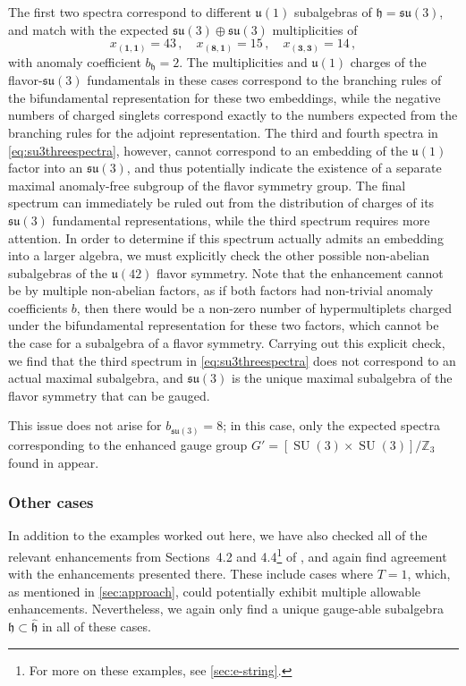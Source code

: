 \documentclass[11pt, a4paper]{article}
\newcommand*{\bbZ}{\ensuremath{\mathbb{Z}}}
\newcommand*{\fkh}{\ensuremath{\mathfrak{h}}}
\DeclareMathOperator{\SU}{SU}
\newcommand*{\fku}{\ensuremath{\mathfrak{u}}}
\newcommand*{\fksu}{\ensuremath{\mathfrak{su}}}
\begin{document}
The first two spectra correspond to different $\fku(1)$ subalgebras of $\fkh = \fksu(3)$, and match with the expected $\fksu(3) \oplus \fksu(3)$ multiplicities of
    \begin{equation}
        x_{(\bm{1}, \bm{1})} = 43\,, \quad x_{(\bm{8}, \bm{1})} = 15\,, \quad x_{(\bm{3}, \bm{3})} = 14\,,
    \end{equation}
with anomaly coefficient $b_\fkh = 2$. The multiplicities and $\fku(1)$ charges of the flavor-$\fksu(3)$ fundamentals in these cases correspond to the branching rules of the bifundamental representation for these two embeddings, while the negative numbers of charged singlets correspond exactly to the numbers expected from the branching rules for the adjoint representation. The third and fourth spectra in \cref{eq:su3threespectra}, however, cannot correspond to an embedding of the $\fku(1)$ factor into an $\fksu(3)$, and thus potentially indicate the existence of a separate maximal anomaly-free subgroup of the flavor symmetry group. The final spectrum can immediately be ruled out from the distribution of charges of its $\fksu(3)$ fundamental representations, while the third spectrum requires more attention. In order to determine if this spectrum actually admits an embedding into a larger algebra, we must explicitly check the other possible non-abelian subalgebras of the $\fku(42)$ flavor symmetry. Note that the enhancement cannot be by multiple non-abelian factors, as if both factors had non-trivial anomaly coefficients $b$, then there would be a non-zero number of hypermultiplets charged under the bifundamental representation for these two factors, which cannot be the case for a subalgebra of a flavor symmetry. Carrying out this explicit check, we find that the third spectrum in \cref{eq:su3threespectra} does not correspond to an actual maximal subalgebra, and $\fksu(3)$ is the unique maximal subalgebra of the flavor symmetry that can be gauged.

This issue does not arise for $b_{\fksu(3)} = 8$; in this case, only the expected spectra corresponding to the enhanced gauge group $G' = [\SU(3) \times \SU(3)] / \bbZ_3$ found in \cite{Raghuram:2020vxm} appear.



\subsubsection{Other cases}

In addition to the examples worked out here, we have also checked all of the relevant enhancements from Sections~4.2 and 4.4\footnote{For more on these examples, see \cref{sec:e-string}.} of \cite{Raghuram:2020vxm}, and again find agreement with the enhancements presented there. These include cases where $T = 1$, which, as mentioned in \cref{sec:approach}, could potentially exhibit multiple allowable enhancements. Nevertheless, we again only find a unique gauge-able subalgebra $\fkh \subset \hat{\fkh}$ in all of these cases.
\end{document}
